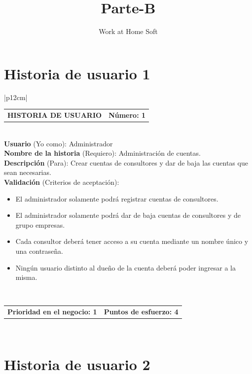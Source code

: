 \documentclass[11pt,letterpaper]{report}
\title{\Huge Parte-B}
\author{Work at Home Soft}
\begin{document}
	
	\tableofcontents
	
	\section{Historia de usuario 1}
	\begin{center}	
	\begin{tabular}{|p{12cm}|}
		\hline
		\begin{tabular}{c|c}
			\textbf{HISTORIA DE USUARIO} & \textbf{Número: 1} \\
		\end{tabular} \\ \hline
		\textbf{Usuario} (Yo como): Administrador \\ \hline
		\textbf{Nombre de la historia} (Requiero): Administración de cuentas. \\ \hline
		\textbf{Descripción} (Para): Crear cuentas de consultores y dar de baja las cuentas que sean necesarias. \\ \hline
		\textbf{Validación} (Criterios de aceptación): \\
		\begin{minipage}{12cm}
			\begin{itemize}
				\item El administrador solamente podrá registrar cuentas de consultores.
				\item El administrador solamente podrá dar de baja cuentas de consultores y de grupo empresas.
				\item Cada consultor deberá tener acceso a su cuenta mediante un nombre único y una contraseña.
				\item Ningún usuario distinto al dueño de la cuenta deberá poder ingresar a la misma.
			\end{itemize}
		\end{minipage} \\ \hline
				\begin{tabular}{c|c}
					\textbf{Prioridad en el negocio: 1} & \textbf{Puntos de esfuerzo: 4} \\
				\end{tabular} \\ \hline
	\end{tabular}
	\end{center}
	
	\section{Historia de usuario 2}
	
\end{document}
